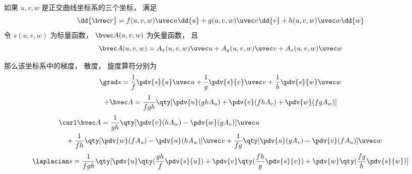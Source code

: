 
\begin{issues}
\issueDraft
\end{issues}


如果 $u, v, w$ 是正交曲线坐标系的三个坐标， 满足
\begin{equation}\label{CurCor_eq4}
\dd{\bvec r} = f(u,v,w)\uvec u\dd{u} + g(u,v,w)\uvec v\dd{v} + h(u,v,w)\uvec w\dd{w}
\end{equation}
令 $s(u, v, w)$ 为标量函数， $\bvec A(u, v, w)$ 为矢量函数， 且
\begin{equation}
\bvec A(u, v, w) = A_x(u, v, w)\uvec u + A_y(u, v, w)\uvec v + A_z(u, v, w)\uvec w
\end{equation}

那么该坐标系中的梯度， 散度， 旋度算符分别为
\begin{equation}
\grad s = \frac{1}{f} \pdv{s}{u}\uvec u + \frac{1}{g}\pdv{s}{v} \uvec v + \frac{1}{h} \pdv{s}{w}\uvec w
\end{equation}
\begin{equation}
\div \bvec A = \frac{1}{fgh}\qty[\pdv{u}(ghA_u) + \pdv{v}(fhA_v) + \pdv{w}(fgA_w)]
\end{equation}
\begin{equation}
\begin{aligned}
&\curl \bvec A = \frac{1}{gh}\qty[\pdv{v}(hA_w) - \pdv{w}(gA_v)]\uvec u\\
&\quad + \frac{1}{fh}\qty[\pdv{w}(fA_u) - \pdv{u}(hA_w)]\uvec v
+ \frac{1}{fg}\qty[\pdv{u}(gA_v) - \pdv{v}(fA_u)]\uvec w
\end{aligned}
\end{equation}
\begin{equation}\label{CurCor_eq6}
\laplacian s = \frac{1}{fgh}\qty[\pdv{u}\qty(\frac{gh}{f}\pdv{s}{u}) + \pdv{v}\qty(\frac{fh}{g}\pdv{s}{v}) + \pdv{w}\qty(\frac{fg}{h}\pdv{s}{w})]
\end{equation}



